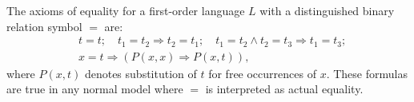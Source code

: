 The axioms of equality for a first-order language $L$ with a distinguished binary relation symbol $=$ are:
\begin{align*}
&t = t; \quad t_1 = t_2 \Rightarrow t_2 = t_1; \quad t_1 = t_2 \wedge t_2 = t_3 \Rightarrow t_1 = t_3;\\
&x = t \Rightarrow (P(x, x) \Rightarrow P(x, t)),
\end{align*}
where $P(x, t)$ denotes substitution of $t$ for free occurrences of $x$. These formulas are true in any normal model where $=$ is interpreted as actual equality.
